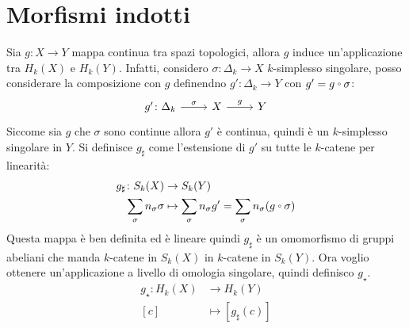 \documentclass[10pt, twoside=false, x11names]{scrbook}
\newcommand{\Id}[1][]{\mathbb{I}_#1}
\newcommand*\quot[2]{{^{\textstyle #1}\big/_{\textstyle #2}}}
\let\latexcirc=\circ
\newcommand{\ccirc}{\mathbin{\mathchoice
  {\xcirc\scriptstyle}
  {\xcirc\scriptstyle}
  {\xcirc\scriptscriptstyle}
  {\xcirc\scriptscriptstyle}
}}
\newcommand{\xcirc}[1]{\vcenter{\hbox{$#1\latexcirc$}}}
\let\circ\ccirc
\let\phi\varphi
\begin{document}

\section{Morfismi indotti}

Sia $ g \colon X \to Y $ mappa continua tra spazi topologici,
allora
$ g $ induce un'applicazione tra $ H_k(X) $ e $ H_k(Y) $.
Infatti, considero $ \sigma \colon \Delta_k \to X $ $ k $-simplesso singolare, posso
considerare la composizione con $ g $ definendno $ g' \colon \Delta_k \to Y $ con $ g' = g \circ \sigma $:
\[
  \begin{tikzcd}
    g' \colon \Delta_k \arrow{r}{\sigma} &  X  \arrow{r}{g} & Y
  \end{tikzcd}
\]
Siccome sia $ g $ che $ \sigma $ sono continue allora $ g' $ è continua, quindi è un
$ k $-simplesso singolare in $ Y $.
Si definisce $ g_\sharp $ come l'estensione di $ g' $ su tutte le $ k $-catene
per linearità:
\begin{align*}
  g_\sharp \colon S_k(X) & \to S_k(Y) \\
  \sum_\sigma n_\sigma \sigma & \mapsto  \sum_\sigma n_\sigma g' =  \sum_\sigma n_\sigma ( g \circ \sigma )
\end{align*}
Questa mappa è ben definita ed è lineare quindi $ g_\sharp $ è un omomorfismo di
gruppi abeliani che manda $ k $-catene in $ S_k(X) $ in $ k $-catene
in $ S_k(Y) $.
Ora voglio ottenere un'applicazione a livello di omologia singolare,
quindi definisco $ g_\star $.
\begin{align*}
  g_\star \colon H_k(X) & \to H_k(Y) \\
  [c]          & \mapsto [g_\sharp (c)]
\end{align*}
\end{document}
